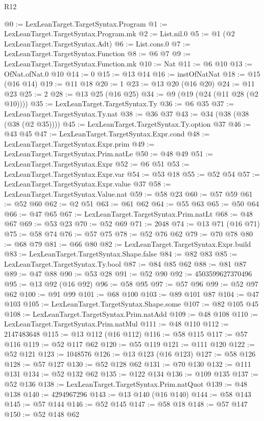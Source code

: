 \begin{lexlean}{R12}
\begin{coremodule}
@0 := LexLeanTarget.TargetSyntax.Program
@1 := LexLeanTarget.TargetSyntax.Program.mk
@2 := List.nil.{0}
@5 := @1 (@2 LexLeanTarget.TargetSyntax.Adt)
@6 := List.cons.{0}
@7 := LexLeanTarget.TargetSyntax.Function
@8 := @6 @7
@9 := LexLeanTarget.TargetSyntax.Function.mk
@10 := Nat
@11 := @6 @10
@13 := OfNat.ofNat.{0} @10
@14 := 0
@15 := @13 @14
@16 := instOfNatNat
@18 := @15 (@16 @14)
@19 := @11 @18
@20 := 1
@23 := @13 @20 (@16 @20)
@24 := @11 @23
@25 := 2
@28 := @13 @25 (@16 @25)
@34 := @9 (@19 (@24 (@11 @28 (@2 @10))))
@35 := LexLeanTarget.TargetSyntax.Ty
@36 := @6 @35
@37 := LexLeanTarget.TargetSyntax.Ty.nat
@38 := @36 @37
@43 := @34 (@38 (@38 (@38 (@2 @35))))
@45 := LexLeanTarget.TargetSyntax.Ty.option @37
@46 := @43 @45
@47 := LexLeanTarget.TargetSyntax.Expr.cond
@48 := LexLeanTarget.TargetSyntax.Expr.prim
@49 := LexLeanTarget.TargetSyntax.Prim.natLe
@50 := @48 @49
@51 := LexLeanTarget.TargetSyntax.Expr
@52 := @6 @51
@53 := LexLeanTarget.TargetSyntax.Expr.var
@54 := @53 @18
@55 := @52 @54
@57 := LexLeanTarget.TargetSyntax.Expr.value @37
@58 := LexLeanTarget.TargetSyntax.Value.nat
@59 := @58 @23
@60 := @57 @59
@61 := @52 @60
@62 := @2 @51
@63 := @61 @62
@64 := @55 @63
@65 := @50 @64
@66 := @47 @65
@67 := LexLeanTarget.TargetSyntax.Prim.natLt
@68 := @48 @67
@69 := @53 @23
@70 := @52 @69
@71 := 2048
@74 := @13 @71 (@16 @71)
@75 := @58 @74
@76 := @57 @75
@78 := @52 @76 @62
@79 := @70 @78
@80 := @68 @79
@81 := @66 @80
@82 := LexLeanTarget.TargetSyntax.Expr.build
@83 := LexLeanTarget.TargetSyntax.Shape.false
@84 := @82 @83
@85 := LexLeanTarget.TargetSyntax.Ty.bool
@87 := @84 @85 @62
@88 := @81 @87
@89 := @47 @88
@90 := @53 @28
@91 := @52 @90
@92 := 4503599627370496
@95 := @13 @92 (@16 @92)
@96 := @58 @95
@97 := @57 @96
@99 := @52 @97 @62
@100 := @91 @99
@101 := @68 @100
@103 := @89 @101 @87
@104 := @47 @103
@105 := LexLeanTarget.TargetSyntax.Shape.some
@107 := @82 @105 @45
@108 := LexLeanTarget.TargetSyntax.Prim.natAdd
@109 := @48 @108
@110 := LexLeanTarget.TargetSyntax.Prim.natMul
@111 := @48 @110
@112 := 2147483648
@115 := @13 @112 (@16 @112)
@116 := @58 @115
@117 := @57 @116
@119 := @52 @117 @62
@120 := @55 @119
@121 := @111 @120
@122 := @52 @121
@123 := 1048576
@126 := @13 @123 (@16 @123)
@127 := @58 @126
@128 := @57 @127
@130 := @52 @128 @62
@131 := @70 @130
@132 := @111 @131
@134 := @52 @132 @62
@135 := @122 @134
@136 := @109 @135
@137 := @52 @136
@138 := LexLeanTarget.TargetSyntax.Prim.natQuot
@139 := @48 @138
@140 := 4294967296
@143 := @13 @140 (@16 @140)
@144 := @58 @143
@145 := @57 @144
@146 := @52 @145
@147 := @58 @18
@148 := @57 @147
@150 := @52 @148 @62

\end{coremodule}
\end{lexlean}
